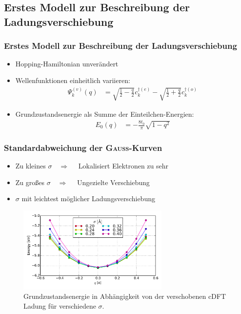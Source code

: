 \subsection{Erstes Modell zur Beschreibung der Ladungsverschiebung}
\begin{frame}
\frametitle{Erstes Modell zur Beschreibung der Ladungsverschiebung}
\begin{itemize}
\setlength{\itemsep}{.8cm}
\item Hopping-Hamiltonian unverändert
\item Wellenfunktionen einheitlich variieren:
\begin{align*}
\Psi_k^{(v)}(q) &= \sqrt{\frac{1}{2}-\frac{q}{2}}c_k^{\dagger(e)}- \sqrt{\frac{1}{2}+\frac{q}{2}}c_{k}^{\dagger(o)}
\end{align*}
\item Grundzustandsenergie als Summe der Einteilchen-Energien:
\begin{align*}
E_0(q) &= -\frac{8t_0}{\pi} \sqrt{1-q^2}
\end{align*}
\end{itemize}
\end{frame}

\begin{frame}
\frametitle{Standardabweichung der \textsc{Gauß}-Kurven}
\begin{itemize}
\item Zu kleines $\sigma\quad\Rightarrow\quad$ Lokalisiert Elektronen zu sehr
\item Zu großes $\sigma\quad\Rightarrow\quad$ Ungezielte Verschiebung
\item $\sigma$ mit leichtest möglicher Ladungsverschiebung
\end{itemize}
\begin{figure}[!t]
	\centering
	\includegraphics[width = 7.5cm]{Images/Hydrogen/charging/gaussian_sigmas}
	\caption{Grundzustandsenergie in Abhängigkeit von der verschobenen cDFT Ladung für verschiedene $\sigma$.}
	\label{image_gaussian_sigmas_hydrogen}
\end{figure}
\end{frame}

